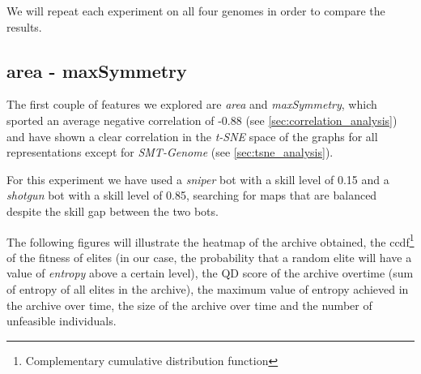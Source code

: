 We will repeat each experiment on all four genomes in order to compare the results.

\subsection{area - maxSymmetry}
\label{subsec:exp1}
The first couple of features we explored are \textit{area} and \textit{maxSymmetry}, which sported an average negative correlation of -0.88 (see \cref{sec:correlation_analysis}) and have shown a clear correlation in the \textit{t-SNE} space of the graphs for all representations except for \textit{SMT-Genome} (see \cref{sec:tsne_analysis}).

For this experiment we have used a \textit{sniper} bot with a skill level of 0.15 and a \textit{shotgun} bot with a skill level of 0.85, searching for maps that are balanced despite the skill gap between the two bots.

The following figures will illustrate the heatmap of the archive obtained, the ccdf\footnote{Complementary cumulative distribution function} of the fitness of elites (in our case, the probability that a random elite will have a value of \textit{entropy} above a certain level), the QD score of the archive overtime (sum of entropy of all elites in the archive), the maximum value of entropy achieved in the archive over time, the size of the archive over time and the number of unfeasible individuals. 


